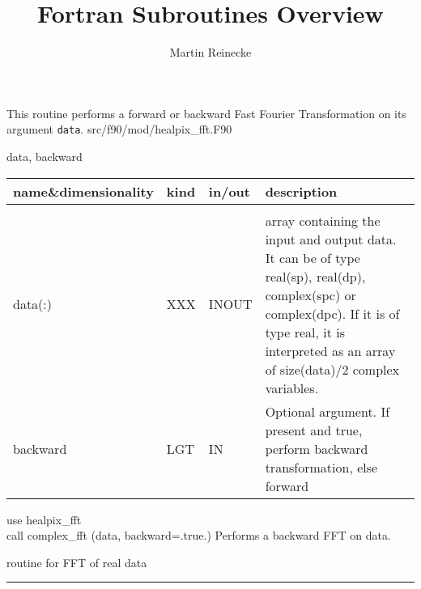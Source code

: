 \sloppy

\title{\healpix Fortran Subroutines Overview}
 \section[complex\_fft]{ }
\label{sub:complex_fft}
\author{Martin Reinecke}

\begin{facility}
{This routine performs a forward or backward Fast Fourier Transformation
on its argument {\tt data}.}
{src/f90/mod/healpix\_fft.F90}
\end{facility}

\begin{f90format}
{data, backward}
\end{f90format}

\begin{arguments}
{
\begin{tabular}{p{0.3\hsize} p{0.05\hsize} p{0.1\hsize} p{0.45\hsize}} \hline  
\textbf{name\&dimensionality} & \textbf{kind} & \textbf{in/out} & \textbf{description} \\ \hline
                   &   &   &                           \\ %
data(:) & XXX & INOUT &
  array containing the input and output data. It can be of type
  real(sp), real(dp), complex(spc) or complex(dpc). If it is of type real,
  it is interpreted as an array of size(data)/2 complex variables.  \\
backward & LGT & IN & Optional argument. If present and true, perform backward transformation, else forward \\
\end{tabular}}
\end{arguments}

\begin{example}
{
use healpix\_fft \\
call complex\_fft (data, backward=.true.)
}
{
Performs a backward FFT on data.
}
\end{example}

\begin{related}
  \begin{sulist}{} %
  \item[\htmlref{real\_fft}{sub:real_fft}] routine for FFT of real data
  \end{sulist}
\end{related}

\rule{\hsize}{2mm}

\newpage
